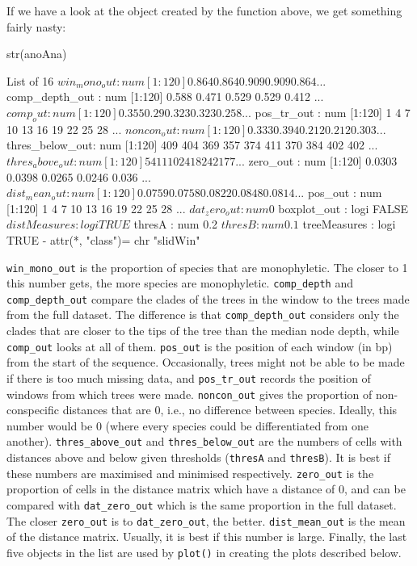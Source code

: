 \documentclass{article}
\newcommand{\fun}[1]{\texttt{#1}}
\begin{document}
If we have a look at the object created by the function above, we get something fairly nasty:

\begin{console}
str(anoAna)
\end{console}

\begin{Routput}
List of 16
 $ win_mono_out   : num [1:120] 0.864 0.864 0.909 0.909 0.864 ...
 $ comp_depth_out : num [1:120] 0.588 0.471 0.529 0.529 0.412 ...
 $ comp_out       : num [1:120] 0.355 0.29 0.323 0.323 0.258 ...
 $ pos_tr_out     : num [1:120] 1 4 7 10 13 16 19 22 25 28 ...
 $ noncon_out     : num [1:120] 0.333 0.394 0.212 0.212 0.303 ...
 $ thres_below_out: num [1:120] 409 404 369 357 374 411 370 384 402 402 ...
 $ thres_above_out: num [1:120] 5 4 11 10 24 18 24 21 7 7 ...
 $ zero_out       : num [1:120] 0.0303 0.0398 0.0265 0.0246 0.036 ...
 $ dist_mean_out  : num [1:120] 0.0759 0.0758 0.0822 0.0848 0.0814 ...
 $ pos_out        : num [1:120] 1 4 7 10 13 16 19 22 25 28 ...
 $ dat_zero_out   : num 0
 $ boxplot_out    : logi FALSE
 $ distMeasures   : logi TRUE
 $ thresA         : num 0.2
 $ thresB         : num 0.1
 $ treeMeasures   : logi TRUE
 - attr(*, "class")= chr "slidWin"
\end{Routput}

\verb|win_mono_out| is the proportion of species that are monophyletic. The closer to 1 this number gets, the more species are monophyletic.
\verb|comp_depth| and \verb|comp_depth_out| compare the clades of the trees in the window to the trees made from the full dataset. The difference is that \verb|comp_depth_out| considers only the clades that are closer to the tips of the tree than the median node depth, while \verb|comp_out| looks at all of them.
\verb|pos_out| is the position of each window (in bp) from the start of the sequence. Occasionally, trees might not be able to be made if there is too much missing data, and \verb|pos_tr_out| records the position of windows from which trees were made.
\verb|noncon_out| gives the proportion of non-conspecific distances that are 0, i.e., no difference between species. Ideally, this number would be 0 (where every species could be differentiated from one another).
\verb|thres_above_out| and \verb|thres_below_out| are the numbers of cells with distances above and below given thresholds (\verb|thresA| and \verb|thresB|). It is best if these numbers are maximised and minimised respectively.
\verb|zero_out| is the proportion of cells in the distance matrix which have a distance of 0, and can be compared with \verb|dat_zero_out| which is the same proportion in the full dataset. The closer \verb|zero_out| is to \verb|dat_zero_out|, the better.
\verb|dist_mean_out| is the mean of the distance matrix. Usually, it is best if this number is large.
Finally, the last five objects in the list are used by \fun{plot()} in creating the plots  described below.
\end{document}
